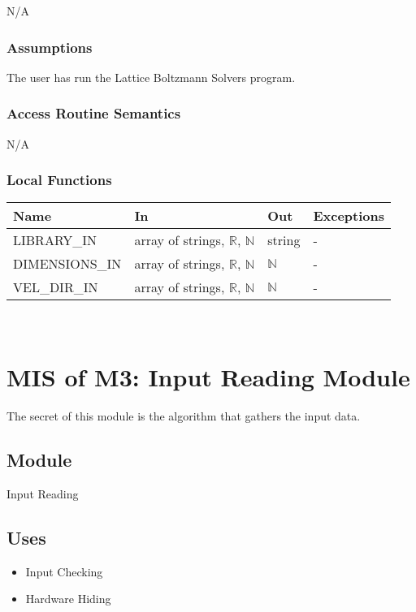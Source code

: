 \documentclass[12pt, titlepage]{article}
\newcommand{\famname}{Lattice Boltzmann Solvers}
\begin{document}
N/A

\subsubsection{Assumptions}

The user has run the {\famname} program.

\subsubsection{Access Routine Semantics}

N/A

\subsubsection{Local Functions}

\begin{center}
	\begin{tabular}{p{4cm} p{4cm} p{2cm} p{2cm}}
		\hline
		\textbf{Name} & \textbf{In} & \textbf{Out} & \textbf{Exceptions} \\
		\hline
		LIBRARY\_IN & array of strings, $\mathbb{R}$, $\mathbb{N}$ & string &- \\
		DIMENSIONS\_IN & array of strings, $\mathbb{R}$, $\mathbb{N}$ & $\mathbb{N}$ &- \\
		VEL\_DIR\_IN & array of strings, $\mathbb{R}$, $\mathbb{N}$ & $\mathbb{N}$ &- \\
		\hline
	\end{tabular}
\end{center}


~\newpage

\section{MIS of M3: Input Reading Module} \label{IRModule} 

The secret of this module is the algorithm that gathers the input data.

\subsection{Module}

Input Reading

\subsection{Uses}

\begin{itemize}
	\item Input Checking
	\item Hardware Hiding
\end{itemize}
\end{document}
